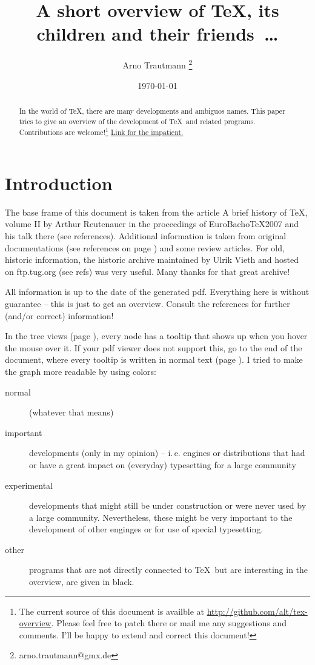 \documentclass{scrartcl}
\title{A short overview of \TeX, its children and their friends~\dots}
\author{Arno Trautmann \thanks{arno.trautmann@gmx.de}}
\date{\today}
\begin{document}
\maketitle

\begin{abstract}
In the world of \TeX, there are many developments and ambiguos names. This paper tries to give an overview of the development of \TeX\ and related programs. Contributions are welcome!\footnote{The current source of this document is availble at \url{http://github.com/alt/tex-overview}. Please feel free to patch there or mail me any suggestions and comments. I’ll be happy to extend and correct this document!}
\hyperref[textextview]{Link for the impatient.}
\end{abstract}

\section*{Introduction}
The base frame of this document is taken from the article \textsf{A brief history of \TeX, volume II} by Arthur Reutenauer in the proceedings of \textsf{EuroBacho\TeX 2007} and his talk there (see references). Additional information is taken from original documentations (see references on page \pageref{sec:refs}) and some review articles. For old, historic information, the \textsf{historic archive} maintained by Ulrik Vieth and hosted on ftp.tug.org (see refs) was very useful. Many thanks for that great archive!

All information is up to the date of the generated pdf. Everything here is without guarantee – this is just to get an overview. Consult the references for further (and/or correct) information! 

In the tree views (page \pageref{sec:tree}), every node has a tooltip that shows up when you hover the mouse over it. If your pdf viewer does not support this, go to the end of the document, where every tooltip is written in normal text (page \pageref{sec:text}). I tried to make the graph more readable by using colors:

\begin{description}
\item[{\color{\normalimportant!70!black} normal}] (whatever that means)
\item[{\color{\vip!70!black} important}] developments (only in my opinion) – i.\,e. engines or distributions that had or have a great impact on (everyday) typesetting for a large community
\item[{\color{\experimental!70!black} experimental}] developments that might still be under construction or were never used by a large community. Nevertheless, these might be very important to the development of other enginges or for use of special typesetting.
\item[{\color{\other!70!black} other}] programs that are not directly connected to \TeX\ but are interesting in the overview, are given in black.
\end{description}
\end{document}
